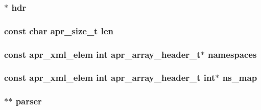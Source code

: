 \subsubsection[{\texorpdfstring{hdr}{hdr}}]{$\ast$ hdr}\hypertarget{group__APR__Util__XML_gacbb04b51077cdb37e6a8cfa4c93acb07}{}\label{group__APR__Util__XML_gacbb04b51077cdb37e6a8cfa4c93acb07}
\subsubsection[{\texorpdfstring{len}{len}}]{\setlength{\rightskip}{0pt plus 5cm}const char {\bf apr\+\_\+size\+\_\+t} len}\hypertarget{group__APR__Util__XML_ga1e9401816e3a1cf930f448db46978ea7}{}\label{group__APR__Util__XML_ga1e9401816e3a1cf930f448db46978ea7}
\subsubsection[{\texorpdfstring{namespaces}{namespaces}}]{\setlength{\rightskip}{0pt plus 5cm}const {\bf apr\+\_\+xml\+\_\+elem} {\bf int} {\bf apr\+\_\+array\+\_\+header\+\_\+t}$\ast$ namespaces}\hypertarget{group__APR__Util__XML_gafc0bf98d924fee6000a1e0eb9703d338}{}\label{group__APR__Util__XML_gafc0bf98d924fee6000a1e0eb9703d338}
\subsubsection[{\texorpdfstring{ns\+\_\+map}{ns_map}}]{\setlength{\rightskip}{0pt plus 5cm}const {\bf apr\+\_\+xml\+\_\+elem} {\bf int} {\bf apr\+\_\+array\+\_\+header\+\_\+t} {\bf int}$\ast$ ns\+\_\+map}\hypertarget{group__APR__Util__XML_ga44bcfb254eb6018973e3b5ae84880528}{}\label{group__APR__Util__XML_ga44bcfb254eb6018973e3b5ae84880528}
\subsubsection[{\texorpdfstring{parser}{parser}}]{$\ast$$\ast$ parser}\hypertarget{group__APR__Util__XML_ga770a26ab91fad38f2253d5450d6e600e}{}\label{group__APR__Util__XML_ga770a26ab91fad38f2253d5450d6e600e}
